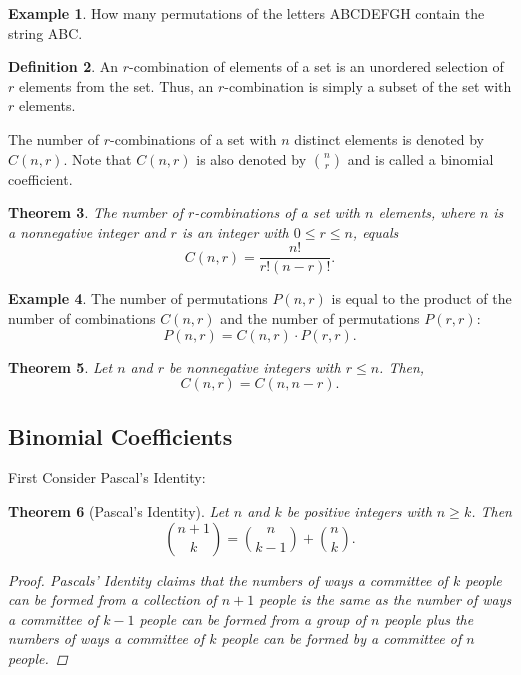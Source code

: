 \documentclass[letterpaper,10pt]{article}
\theoremstyle{plain}
\newtheorem{thm}{Theorem}[section]
\theoremstyle{definition}
\newtheorem{defn}[thm]{Definition}
\newtheorem{exmp}[thm]{Example}
\theoremstyle{remark}
\begin{document}
\begin{exmp}

How many permutations of the letters ABCDEFGH contain the string ABC.
\vspace{3cm}
\end{exmp}
\begin{defn}
    An $r$-combination of elements of a set is an unordered selection of $r$ elements from the set. Thus, an $r$-combination is simply a subset of the set with $r$ elements.
\end{defn}
\begin{definition}
    The number of $r$-combinations of a set with $n$ distinct elements is denoted by $C(n, r)$. Note that $C(n, r)$ is also denoted by $\binom{n}{r}$ and is called a binomial coefficient.
\end{definition}
\begin{thm}
    The number of $r$-combinations of a set with $n$ elements, where $n$ is a nonnegative integer and $r$ is an integer with $0 \leq r \leq n$, equals
    \[
    C(n, r) = \frac{n!}{r! (n - r)!}.
    \]
\end{thm}
\begin{exmp}
    The number of permutations $P(n, r)$ is equal to the product of the number of combinations $C(n, r)$ and the number of permutations $P(r, r)$:
    \[
    P(n, r) = C(n, r) \cdot P(r, r).
    \]
    \vspace{3cm}
\end{exmp}
\begin{thm}

    Let $n$ and $r$ be nonnegative integers with $r \leq n$. Then, 
    \[
    C(n, r) = C(n, n - r).
    \]
    \vspace{3cm}
\end{thm}
\subsection{Binomial Coefficients}

First Consider Pascal's Identity:
\begin{thm}[Pascal's Identity]
    Let \(n\) and \(k\) be positive integers with \(n \geq k\). Then
    \[
    \binom{n+1}{k} = \binom{n}{k-1} + \binom{n}{k}.
    \]
\begin{proof}
Pascals' Identity claims that the numbers of ways a committee of $k$ people can be formed from a collection of $n+1$ people is the same as the number of ways a committee of $k-1$ people can be formed from a group of $n$ people plus the numbers of ways a committee of $k$ people can be formed by a committee of $n$ people.
\end{proof}
\end{thm}
\end{document}
